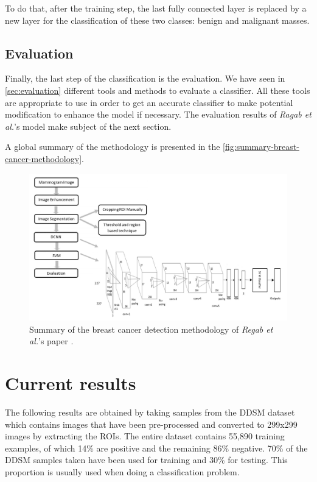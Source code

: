 \documentclass[11pt, openany]{report}
\theoremstyle{plain}
\theoremstyle{definition}
\theoremstyle{remark}
\begin{document}
To do that, after the training step, the last fully connected layer is replaced by a new layer for the classification of these two classes: benign and malignant masses.

\subsection{Evaluation}
Finally, the last step of the classification is the evaluation. We have seen in \autoref{sec:evaluation} different tools and methods to evaluate a classifier. All these tools are appropriate to use in order to get an accurate classifier to make potential modification to enhance the model if necessary. The evaluation results of \textit{Ragab et al.}'s model make subject of the next section. 

A global summary of the methodology is presented in the \autoref{fig:summary-breast-cancer-methodology}.

\newpage
\hspace*{0mm}\vfill
\begin{figure}[h]
  \centering
  \includegraphics[scale=0.375]{figures/summary-breast-cancer-methodology.png}
  \caption{Summary of the breast cancer detection methodology of \textit{Regab et al.}'s paper \cite{breast-cancer}.}
  \label{fig:summary-breast-cancer-methodology}
\end{figure}
\vfill\hspace*{0mm}

\newpage
\section{Current results}
The following results are obtained by taking samples from the DDSM dataset which contains images that have been pre-processed and converted to 299x299 images by extracting the ROIs. The entire dataset contains 55,890 training examples, of which 14\% are positive and the remaining 86\% negative. 70\% of the DDSM samples taken have been used for training and 30\% for testing. This proportion is usually used when doing a classification problem. 
\end{document}
